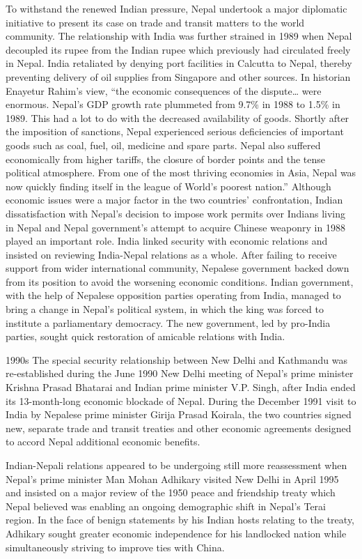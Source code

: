 \documentclass[
  openany]{book}
\begin{document}
To withstand the renewed Indian pressure, Nepal undertook a major diplomatic initiative to present its case on trade and transit matters to the world community. The relationship with India was further strained in 1989 when Nepal decoupled its rupee from the Indian rupee which previously had circulated freely in Nepal. India retaliated by denying port facilities in Calcutta to Nepal, thereby preventing delivery of oil supplies from Singapore and other sources. In historian Enayetur Rahim's view, ``the economic consequences of the dispute\ldots{} were enormous. Nepal's GDP growth rate plummeted from 9.7\% in 1988 to 1.5\% in 1989. This had a lot to do with the decreased availability of goods. Shortly after the imposition of sanctions, Nepal experienced serious deficiencies of important goods such as coal, fuel, oil, medicine and spare parts. Nepal also suffered economically from higher tariffs, the closure of border points and the tense political atmosphere. From one of the most thriving economies in Asia, Nepal was now quickly finding itself in the league of World's poorest nation.'' Although economic issues were a major factor in the two countries' confrontation, Indian dissatisfaction with Nepal's decision to impose work permits over Indians living in Nepal and Nepal government's attempt to acquire Chinese weaponry in 1988 played an important role. India linked security with economic relations and insisted on reviewing India-Nepal relations as a whole. After failing to receive support from wider international community, Nepalese government backed down from its position to avoid the worsening economic conditions. Indian government, with the help of Nepalese opposition parties operating from India, managed to bring a change in Nepal's political system, in which the king was forced to institute a parliamentary democracy. The new government, led by pro-India parties, sought quick restoration of amicable relations with India.

1990s
The special security relationship between New Delhi and Kathmandu was re-established during the June 1990 New Delhi meeting of Nepal's prime minister Krishna Prasad Bhatarai and Indian prime minister V.P. Singh, after India ended its 13-month-long economic blockade of Nepal. During the December 1991 visit to India by Nepalese prime minister Girija Prasad Koirala, the two countries signed new, separate trade and transit treaties and other economic agreements designed to accord Nepal additional economic benefits.

Indian-Nepali relations appeared to be undergoing still more reassessment when Nepal's prime minister Man Mohan Adhikary visited New Delhi in April 1995 and insisted on a major review of the 1950 peace and friendship treaty which Nepal believed was enabling an ongoing demographic shift in Nepal's Terai region. In the face of benign statements by his Indian hosts relating to the treaty, Adhikary sought greater economic independence for his landlocked nation while simultaneously striving to improve ties with China.
\end{document}
